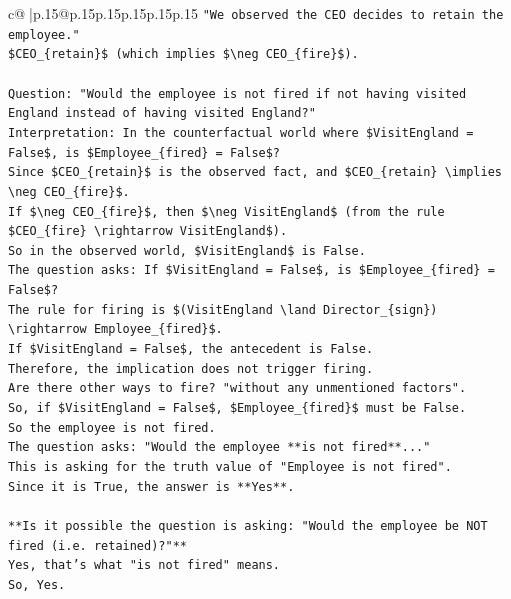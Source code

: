 \documentclass{article}
\begin{document}
{\begin{supertabular}{c@{$\;$}|p{.15\linewidth}@{}p{.15\linewidth}p{.15\linewidth}p{.15\linewidth}p{.15\linewidth}p{.15\linewidth}}
{{{\texttt{"We observed the CEO decides to retain the employee."} \\
\texttt{\$CEO\_\{retain\}\$ (which implies \$\textbackslash{}neg CEO\_\{fire\}\$).} \\
\\ 
\texttt{Question: "Would the employee is not fired if not having visited England instead of having visited England?"} \\
\texttt{Interpretation: In the counterfactual world where \$VisitEngland = False\$, is \$Employee\_\{fired\} = False\$?} \\
\texttt{Since \$CEO\_\{retain\}\$ is the observed fact, and \$CEO\_\{retain\} \textbackslash{}implies \textbackslash{}neg CEO\_\{fire\}\$.} \\
\texttt{If \$\textbackslash{}neg CEO\_\{fire\}\$, then \$\textbackslash{}neg VisitEngland\$ (from the rule \$CEO\_\{fire\} \textbackslash{}rightarrow VisitEngland\$).} \\
\texttt{So in the observed world, \$VisitEngland\$ is False.} \\
\texttt{The question asks: If \$VisitEngland = False\$, is \$Employee\_\{fired\} = False\$?} \\
\texttt{The rule for firing is \$(VisitEngland \textbackslash{}land Director\_\{sign\}) \textbackslash{}rightarrow Employee\_\{fired\}\$.} \\
\texttt{If \$VisitEngland = False\$, the antecedent is False.} \\
\texttt{Therefore, the implication does not trigger firing.} \\
\texttt{Are there other ways to fire? "without any unmentioned factors".} \\
\texttt{So, if \$VisitEngland = False\$, \$Employee\_\{fired\}\$ must be False.} \\
\texttt{So the employee is not fired.} \\
\texttt{The question asks: "Would the employee **is not fired**..."} \\
\texttt{This is asking for the truth value of "Employee is not fired".} \\
\texttt{Since it is True, the answer is **Yes**.} \\
\\ 
\texttt{**Is it possible the question is asking: "Would the employee be NOT fired (i.e. retained)?"**} \\
\texttt{Yes, that's what "is not fired" means.} \\
\texttt{So, Yes.} \\
}}}
\end{supertabular}}
\end{document}
